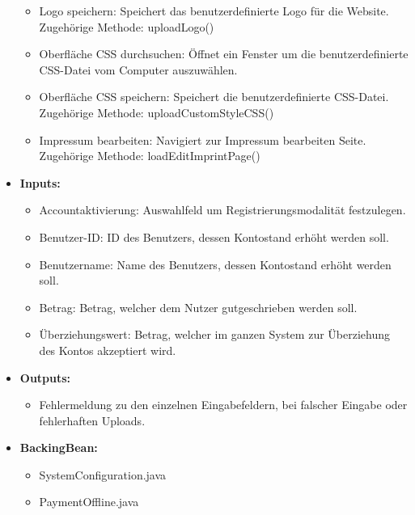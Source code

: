 \begin{itemize}
\begin{itemize}
								\item Logo speichern: Speichert das benutzerdefinierte Logo für die Website. \\ Zugehörige Methode: uploadLogo()
								\item Oberfläche CSS durchsuchen: Öffnet ein Fenster um die benutzerdefinierte CSS-Datei vom Computer auszuwählen. 
								\item Oberfläche CSS speichern: Speichert die benutzerdefinierte CSS-Datei. \\ Zugehörige Methode: uploadCustomStyleCSS()
								\item Impressum bearbeiten: Navigiert zur Impressum bearbeiten Seite. \\ Zugehörige Methode: loadEditImprintPage()
							\end{itemize}
						\item \textbf{Inputs:}
							\begin{itemize}
								\item Accountaktivierung: Auswahlfeld um Registrierungsmodalität festzulegen.
								\item Benutzer-ID: ID des Benutzers, dessen Kontostand erhöht werden soll.
								\item Benutzername: Name des Benutzers, dessen Kontostand erhöht werden soll.
								\item Betrag: Betrag, welcher dem Nutzer gutgeschrieben werden soll.
								\item Überziehungswert: Betrag, welcher im ganzen System zur Überziehung des Kontos akzeptiert wird.
							\end{itemize}
						\item \textbf{Outputs:}
							\begin{itemize}
								\item Fehlermeldung zu den einzelnen Eingabefeldern, bei falscher Eingabe oder fehlerhaften Uploads.
							\end{itemize}
						\item \textbf{BackingBean:}
							\begin{itemize}
								\item SystemConfiguration.java
								\item PaymentOffline.java
							\end{itemize}
					\end{itemize}
				

